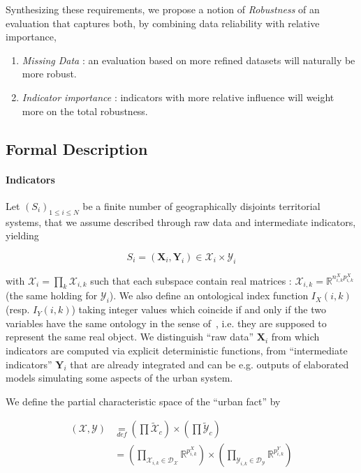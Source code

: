 \documentclass[runningheads,a4paper]{llncs2e/llncs}
\begin{document}
Synthesizing these requirements, we propose a notion of \emph{Robustness} of an evaluation that captures both, by combining data reliability with relative importance,
\begin{enumerate}
\item \emph{Missing Data} : an evaluation based on more refined datasets will naturally be more robust.
\item \emph{Indicator importance} : indicators with more relative influence will weight more on the total robustness.
\end{enumerate}



\subsection{Formal Description}


\paragraph{Indicators}

Let $(S_{i})_{1\leq i\leq N}$ be a finite number of geographically disjoints territorial systems, that we assume described through raw data and intermediate indicators, yielding

\[
S_{i}=(\mathbf{X}_{i},\mathbf{Y}_{i})\in\mathcal{X}_{i}\times\mathcal{Y}_{i}
\]


with $\mathcal{X}_{i}=\prod_{k}\mathcal{X}_{i,k}$ such that each subspace contain real matrices : $\mathcal{X}_{i,k}=\mathbb{R}^{n_{i,k}^{X}p_{i,k}^{X}}$ (the same holding for $\mathcal{Y}_{i}$). We also define an ontological index function $I_{X}(i,k)$ (resp. $I_{Y}(i,k)$) taking integer values which coincide if and only if the two variables have the same ontology in the sense of~\cite{livet2010}, i.e. they are supposed to represent the same real object. We distinguish ``raw data'' $\mathbf{X}_{i}$ from which indicators are computed via explicit deterministic functions, from ``intermediate indicators'' $\mathbf{Y}_{i}$ that are already integrated and can be e.g. outputs of elaborated models simulating some aspects of the urban system.

We define the partial characteristic space of the ``urban fact'' by 

\begin{equation}
\begin{split}
(\mathcal{X},\mathcal{Y}) & \underset{def}{=} \left(\prod\tilde{\mathcal{X}}_{c}\right)\times\left(\prod\tilde{\mathcal{Y}}_{c}\right)\\
& =  \left(\prod_{\mathcal{X}_{i,k}\in\mathcal{D}_{\mathcal{X}}}\mathbb{R}^{p_{i,k}^{X}}\right)\times\left(\prod_{\mathcal{Y}_{i,k}\in\mathcal{D}_{\mathcal{Y}}}\mathbb{R}^{p_{i,k}^{Y}}\right)
\end{split}
\end{equation}
\end{document}
